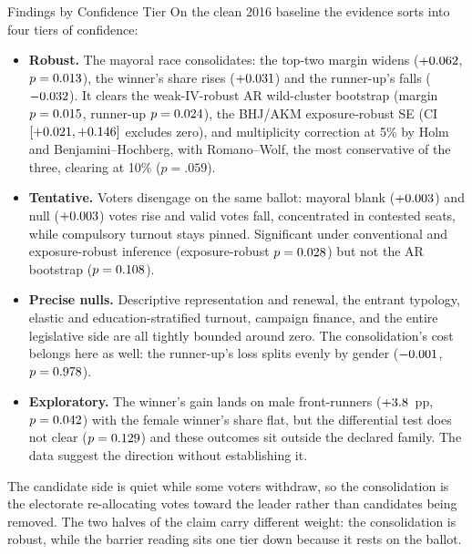 
\begin{frame}{Findings by Confidence Tier}
\hypertarget{src:findings}{}
\footnotesize
On the clean 2016 baseline the evidence sorts into four tiers of confidence:
\medskip
\begin{itemize}\itemsep1pt
  \item[\textcolor{myred}{\rule{1.2ex}{1.2ex}}] \textbf{Robust.} The mayoral race consolidates: the top-two margin widens ($+0.062$, $p=0.013$), the winner's share rises ($+0.031$) and the runner-up's falls ($-0.032$). It clears the weak-IV-robust AR wild-cluster bootstrap (margin $p=0.015$, runner-up $p=0.024$), the BHJ/AKM exposure-robust SE (CI $[+0.021, +0.146]$ excludes zero), and multiplicity correction at 5\% by Holm and Benjamini--Hochberg, with Romano--Wolf, the most conservative of the three, clearing at 10\% ($p=.059$).
  \item[\textcolor{myred!55}{\rule{1.2ex}{1.2ex}}] \textbf{Tentative.} Voters disengage on the same ballot: mayoral blank ($+0.003$) and null ($+0.003$) votes rise and valid votes fall, concentrated in contested seats, while compulsory turnout stays pinned. Significant under conventional and exposure-robust inference (exposure-robust $p=0.028$) but not the AR bootstrap ($p=0.108$).
  \item[\textcolor{mygray}{\rule{1.2ex}{1.2ex}}] \textbf{Precise nulls.} Descriptive representation and renewal, the entrant typology, elastic and education-stratified turnout, campaign finance, and the entire legislative side are all tightly bounded around zero. The consolidation's cost belongs here as well: the runner-up's loss splits evenly by gender ($-0.001$, $p=0.978$).
  \item[\textcolor{mygray!55}{\rule{1.2ex}{1.2ex}}] \textbf{Exploratory.} The winner's gain lands on male front-runners ($+3.8$~pp, $p=0.042$) with the female winner's share flat, but the differential test does not clear ($p=0.129$) and these outcomes sit outside the declared family. The data suggest the direction without establishing it.
\end{itemize}
\medskip
\footnotesize The candidate side is quiet while some voters withdraw, so the consolidation is the electorate re-allocating votes toward the leader rather than candidates being removed. The two halves of the claim carry different weight: the consolidation is robust, while the barrier reading sits one tier down because it rests on the ballot.
\end{frame}
